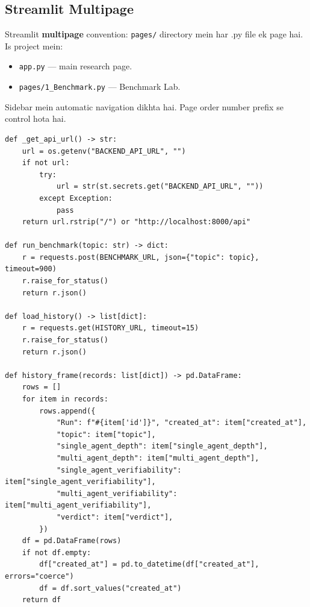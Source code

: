 \documentclass[11pt, a4paper]{article}
\begin{document}
\subsection{Streamlit Multipage}

\begin{conceptbox}
Streamlit \textbf{multipage} convention: \texttt{pages/} directory mein har .py file ek page hai. Is project mein:\begin{itemize}
\item \texttt{app.py} --- main research page.
\item \texttt{pages/1\_Benchmark.py} --- Benchmark Lab.
\end{itemize}
Sidebar mein automatic navigation dikhta hai. Page order number prefix se control hota hai.
\end{conceptbox}

\begin{lstlisting}[style=pythonstyle, caption={pages/1\_Benchmark.py --- API Client + Charts}]
def _get_api_url() -> str:
    url = os.getenv("BACKEND_API_URL", "")
    if not url:
        try:
            url = str(st.secrets.get("BACKEND_API_URL", ""))
        except Exception:
            pass
    return url.rstrip("/") or "http://localhost:8000/api"

def run_benchmark(topic: str) -> dict:
    r = requests.post(BENCHMARK_URL, json={"topic": topic}, timeout=900)
    r.raise_for_status()
    return r.json()

def load_history() -> list[dict]:
    r = requests.get(HISTORY_URL, timeout=15)
    r.raise_for_status()
    return r.json()

def history_frame(records: list[dict]) -> pd.DataFrame:
    rows = []
    for item in records:
        rows.append({
            "Run": f"#{item['id']}", "created_at": item["created_at"],
            "topic": item["topic"],
            "single_agent_depth": item["single_agent_depth"],
            "multi_agent_depth": item["multi_agent_depth"],
            "single_agent_verifiability": item["single_agent_verifiability"],
            "multi_agent_verifiability": item["multi_agent_verifiability"],
            "verdict": item["verdict"],
        })
    df = pd.DataFrame(rows)
    if not df.empty:
        df["created_at"] = pd.to_datetime(df["created_at"], errors="coerce")
        df = df.sort_values("created_at")
    return df
\end{lstlisting}
\end{document}
